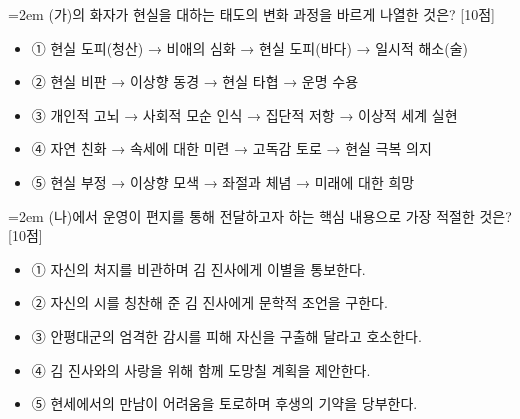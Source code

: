 \documentclass[10pt,a4paper]{article}
\newcommand{\qnum}[1]{%
  \tikz[baseline=(num.base)]{%
    \node[circle, fill=numCircle, text=white, inner sep=0pt,
          minimum size=18pt, font=\small\bfseries] (num) {#1};%
  }%
}
\newcommand{\pts}[1]{%
  \hfill\textcolor{ptsBadge}{[#1점]}%
}
\begin{document}
\vspace{4mm}
\begin{minipage}{\columnwidth}
{\hangindent=2em
\qnum{22}\enspace (가)의 화자가 현실을 대하는 태도의 변화 과정을 바르게 나열한 것은? \pts{10}
\par}

\vspace{3mm}
\begin{itemize}[leftmargin=2.5em, labelsep=0.3em, label={}, itemsep=4pt, parsep=1pt, topsep=0pt]
  \item ① 현실 도피(청산) → 비애의 심화 → 현실 도피(바다) → 일시적 해소(술)
  \item ② 현실 비판 → 이상향 동경 → 현실 타협 → 운명 수용
  \item ③ 개인적 고뇌 → 사회적 모순 인식 → 집단적 저항 → 이상적 세계 실현
  \item ④ 자연 친화 → 속세에 대한 미련 → 고독감 토로 → 현실 극복 의지
  \item ⑤ 현실 부정 → 이상향 모색 → 좌절과 체념 → 미래에 대한 희망
\end{itemize}
\end{minipage}
\vspace{4mm}

\vspace{4mm}
\begin{minipage}{\columnwidth}
{\hangindent=2em
\qnum{23}\enspace (나)에서 운영이 편지를 통해 전달하고자 하는 핵심 내용으로 가장 적절한 것은? \pts{10}
\par}

\vspace{3mm}
\begin{itemize}[leftmargin=2.5em, labelsep=0.3em, label={}, itemsep=4pt, parsep=1pt, topsep=0pt]
  \item ① 자신의 처지를 비관하며 김 진사에게 이별을 통보한다.
  \item ② 자신의 시를 칭찬해 준 김 진사에게 문학적 조언을 구한다.
  \item ③ 안평대군의 엄격한 감시를 피해 자신을 구출해 달라고 호소한다.
  \item ④ 김 진사와의 사랑을 위해 함께 도망칠 계획을 제안한다.
  \item ⑤ 현세에서의 만남이 어려움을 토로하며 후생의 기약을 당부한다.
\end{itemize}
\end{minipage}
\vspace{4mm}
\end{document}
